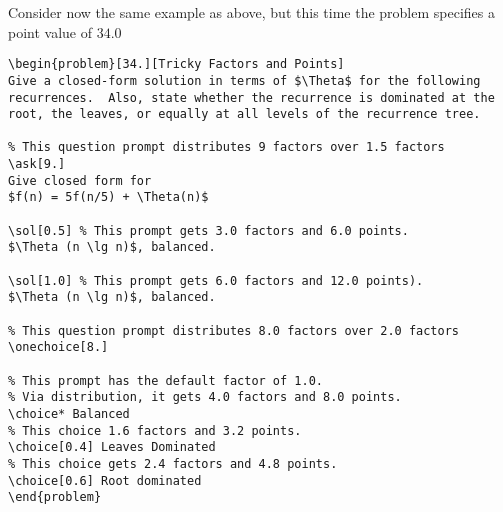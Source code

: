 \begin{example}
Consider now the same example as above, but this time
the problem specifies a point value of $34.0$

\begin{lstlisting}
\begin{problem}[34.][Tricky Factors and Points]
Give a closed-form solution in terms of $\Theta$ for the following
recurrences.  Also, state whether the recurrence is dominated at the
root, the leaves, or equally at all levels of the recurrence tree.

% This question prompt distributes 9 factors over 1.5 factors
\ask[9.]
Give closed form for  
$f(n) = 5f(n/5) + \Theta(n)$

\sol[0.5] % This prompt gets 3.0 factors and 6.0 points.
$\Theta (n \lg n)$, balanced.

\sol[1.0] % This prompt gets 6.0 factors and 12.0 points).
$\Theta (n \lg n)$, balanced.

% This question prompt distributes 8.0 factors over 2.0 factors 
\onechoice[8.] 

% This prompt has the default factor of 1.0.
% Via distribution, it gets 4.0 factors and 8.0 points. 
\choice* Balanced 
% This choice 1.6 factors and 3.2 points.
\choice[0.4] Leaves Dominated  
% This choice gets 2.4 factors and 4.8 points.
\choice[0.6] Root dominated   
\end{problem}
\end{lstlisting}
\end{example}

